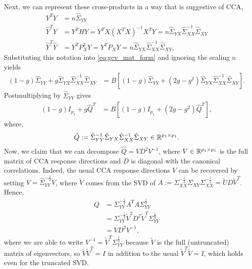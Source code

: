 \documentclass[14pt]{extarticle}
\begin{document}
Next, we can represent these cross-products in a way that is suggestive of CCA,
\begin{align*}
  Y^{T}Y &= n \hat{\Sigma}_{YY} \\
  \hat{Y}^{T}Y &= Y^{T}HY = Y^{T}X\left(X^{T}X\right)^{-1}X^{T}Y =
  n\hat{\Sigma}_{YX}\hat{\Sigma}_{XX}^{-1} \hat{\Sigma}_{XY} \\
  \hat{Y}^{T}\hat{Y} &= Y^{T}P_{X}^2 Y = Y^{T}P_{X}Y=
  n\hat{\Sigma}_{YX}\hat{\Sigma}_{XX}^{-1} \hat{\Sigma}_{XY},
\end{align*}
Substituting this notation into \ref{eq:gcv_mat_form} and ignoring the scaling
$n$ yields
\begin{align*}
\left(1 - g\right)\hat{\Sigma}_{YY} + g
\hat{\Sigma}_{YX}\hat{\Sigma}_{XX}^{-1}\hat{\Sigma}_{XY} &=
B\left[\left(1 - g\right)\hat{\Sigma}_{YY} + \left(2g -
    g^{2}\right)\hat{\Sigma}_{YX}\hat{\Sigma}_{XX}^{-1}\hat{\Sigma}_{XY}\right].
\end{align*}
Postmultiplying by $\hat{\Sigma}_{YY}$ gives
\begin{align}
  \left(1 - g\right)I_{p_{1}} + g\hat{Q}^{T} &= B\left[\left(1 -
      g\right)I_{p_{1}} + \left(2g -
      g^{2}\right)\hat{Q}^{T}\right], \label{eq:cca_gcv_id}
\end{align}
where,
\begin{align*}
\hat{Q} :=
\hat{\Sigma}_{YY}^{-1}\hat{\Sigma}_{YX}\hat{\Sigma}_{XX}^{-1}\hat{\Sigma}_{XY}
\in \mathbb{R}^{p_{1}\times p_{1}}.
\end{align*}
Now, we claim that we can decompose $\hat{Q} = VD^{2}V^{-1}$, where $V \in
\mathbb{R}^{p_{1} \times p_{1}}$ is the full matrix of CCA response directions and
$D$ is diagonal with the canonical correlations. Indeed, the usual CCA response
directions $V$ can be recovered by setting $V =
\hat{\Sigma}_{YY}^{-\frac{1}{2}}\tilde{V}$, where $\tilde{V}$ comes from the SVD
of $A := \Sigma_{XX}^{-\frac{1}{2}}\Sigma_{XY}\Sigma_{XX}^{-\frac{1}{2}} =
\tilde{U}D\tilde{V}^{T}$. Hence,
\begin{align}
  Q &= \Sigma_{YY}^{-\frac{1}{2}}A^{T}A\Sigma_{YY}^{\frac{1}{2}} \\
  &= \Sigma_{YY}^{-\frac{1}{2}}\tilde{V}^{2}D^{2}\tilde{V}^{T}\Sigma_{YY}^{\frac{1}{2}}\\
  &= VD^{2}V^{-1},
\end{align}
where we are able to write $V^{-1} = \tilde{V}^{T}\Sigma_{YY}^{\frac{1}{2}}$
because $\tilde{V}$ is the full (untruncated) matrix of eigenvectors, so
$\tilde{V}\tilde{V}^{T} = I$ in addition to the usual $\tilde{V}^{T}\tilde{V}
=I$, which holds even for the truncated SVD.
\end{document}
